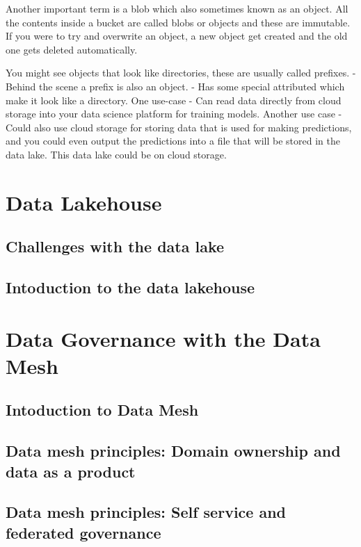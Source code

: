 \documentclass[a4paper, 11pt]{article}
\begin{document}
    Another important term is a blob which also sometimes known as an object.
    All the contents inside a bucket are called blobs or objects and these are immutable.
    If you were to try and overwrite an object, a new object get created and the old one gets deleted automatically.

    You might see objects that look like directories, these are usually called prefixes.
    - Behind the scene a prefix is also an object.
    - Has some special attributed which make it look like a directory.
    One use-case
    - Can read data directly from cloud storage into your data science platform for training models.
    Another use case
    - Could also use cloud storage for storing data that is used for making predictions, and you could even output the predictions into a file that will be stored in the data lake.
    This data lake could be on cloud storage.

    \section{Data Lakehouse}
    
    \subsection{Challenges with the data lake}
    
    \subsection{Intoduction to the data lakehouse}

    \section{Data Governance with the Data Mesh}
    
    \subsection{Intoduction to Data Mesh}

    \subsection{Data mesh principles: Domain ownership and data as a product}

    \subsection{Data mesh principles: Self service and federated governance}
\end{document}
